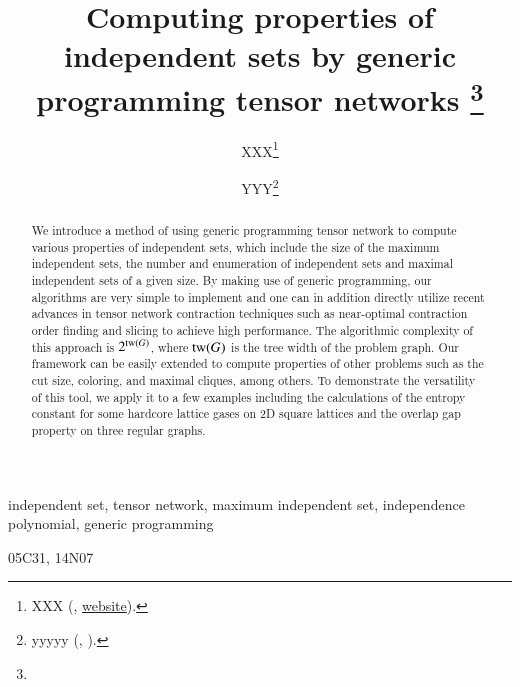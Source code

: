 \documentclass[onefignum, onetabnum]{siamart190516}
\title{Computing properties of independent sets by generic programming tensor networks
\thanks{\funding{...}}
}
\author{XXX\thanks{XXX 
  (\email{email}, \url{website}).}
\and YYY\thanks{yyyyy 
  (\email{yyyy}, \email{email}).}
}
\newcommand{\<}{\langle}
\renewcommand{\>}{\rangle}
\newcounter{example}
\begin{document}
\maketitle

\begin{abstract}
We introduce a method of using generic programming tensor network to compute various properties of independent sets,
which include the size of the maximum independent sets, the number and enumeration of independent sets and maximal independent sets of a given size.
By making use of generic programming, our algorithms are very simple to implement and one can in addition directly utilize recent advances in tensor network contraction techniques such as near-optimal contraction order finding and slicing to achieve high performance.
The algorithmic complexity of this approach is $2^{{\rm tw}(G)}$, where ${\rm tw} (G)$ is the tree width of the problem graph.
Our framework can be easily extended to compute properties of other problems such as the cut size, coloring, and maximal cliques, among others.
To demonstrate the versatility of this tool, we apply it to a few examples including the calculations of the entropy constant for some hardcore lattice gases on 2D square lattices and the overlap gap property on three regular graphs.
\end{abstract}

\begin{keywords}
independent set, tensor network, maximum independent set, independence polynomial, generic programming
\end{keywords}

\begin{AMS}
  05C31, 14N07
\end{AMS}
\end{document}
